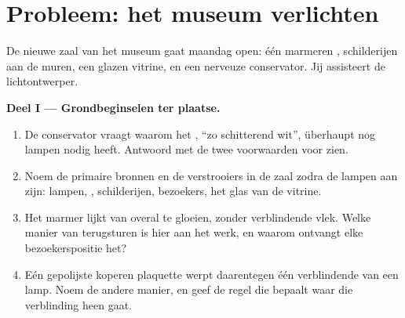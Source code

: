 \section{Probleem: het museum verlichten}

\begin{problem}\label{pb:g7:light-sources-propagation:1}
De nieuwe zaal van het museum gaat maandag open: één marmeren ,
schilderijen aan de muren, een glazen vitrine, en een nerveuze
conservator. Jij assisteert de lichtontwerper.

\medskip\noindent\textbf{Deel I --- Grondbeginselen ter plaatse.}
\begin{enumerate}
  \item De conservator vraagt waarom het , ``zo schitterend
        wit'', überhaupt nog lampen nodig heeft. Antwoord met de twee
        voorwaarden voor zien.
  \item Noem de primaire bronnen en de verstrooiers in de zaal zodra
        de lampen aan zijn: lampen, , schilderijen, bezoekers,
        het glas van de vitrine.
  \item Het marmer lijkt van overal te gloeien, zonder verblindende
        vlek. Welke manier van  terugsturen is hier aan het werk,
        en waarom ontvangt elke bezoekerspositie het?
  \item Eén gepolijste koperen plaquette werpt daarentegen één
        verblindende  van een lamp. Noem de andere manier,
        en geef de regel die bepaalt waar die verblinding heen gaat.
\end{enumerate}


\end{problem}

